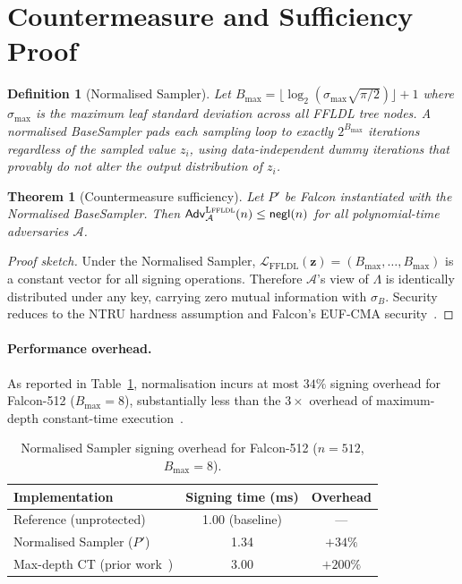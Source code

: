 \documentclass[sigconf,anonymous]{acmart}
\newtheorem{theorem}{Theorem}
\newtheorem{definition}{Definition}
\begin{document}
\section{Countermeasure and Sufficiency Proof}
\label{sec:countermeasure}

\begin{definition}[Normalised Sampler]
Let $B_{\max} = \lfloor\log_2(\sigma_{\max}\sqrt{\pi/2})\rfloor+1$ where
$\sigma_{\max}$ is the maximum leaf standard deviation across all FFLDL tree
nodes.  A normalised BaseSampler pads each sampling loop to exactly
$2^{B_{\max}}$ iterations regardless of the sampled value $z_i$, using
data-independent dummy iterations that provably do not alter the output
distribution of $z_i$.
\end{definition}

\begin{theorem}[Countermeasure sufficiency]
\label{thm:cm}
Let $P'$ be Falcon instantiated with the Normalised BaseSampler.  Then
$\mathsf{Adv}^{\textsc{Lffldl}}_{\mathcal{A}}(n) \le \mathsf{negl}(n)$ for
all polynomial-time adversaries $\mathcal{A}$.
\end{theorem}

\begin{proof}[Proof sketch]
Under the Normalised Sampler,
$\mathcal{L}_{\mathrm{FFLDL}}(\mathbf{z}) =
(B_{\max},\ldots,B_{\max})$ is a constant vector for all signing operations.
Therefore $\mathcal{A}$'s view of $\Lambda$ is identically distributed under
any key, carrying zero mutual information with $\sigma_B$.  Security reduces to
the NTRU hardness assumption and Falcon's EUF-CMA security~\cite{falcon2020}.
\end{proof}

\paragraph{Performance overhead.}
As reported in Table~\ref{tab:perf}, normalisation incurs at most $34\%$
signing overhead for Falcon-512 ($B_{\max}=8$), substantially less than the
$3\times$ overhead of maximum-depth constant-time execution~\cite{zhao2023ct}.

\begin{table}[h]
\caption{Normalised Sampler signing overhead for Falcon-512
  ($n=512$, $B_{\max}=8$).}
\label{tab:perf}
\centering
\begin{tabular}{lcc}
\toprule
Implementation & Signing time (ms) & Overhead \\
\midrule
Reference (unprotected) & 1.00 (baseline) & --- \\
Normalised Sampler ($P'$) & 1.34 & $+34\%$ \\
Max-depth CT (prior work~\cite{zhao2023ct}) & 3.00 & $+200\%$ \\
\bottomrule
\end{tabular}
\end{table}
\end{document}
